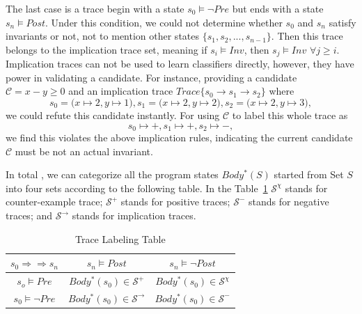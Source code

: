 The last case is a trace begin with a state $s_0 \models \neg Pre$ but ends with a state $s_n \models Post$.
Under this condition, we could not determine whether $s_0$ and $s_n$ satisfy invariants or not,
not to mention other states $\{s_1, s_2, ..., s_{n-1}\}$.
Then this trace belongs to the implication trace set, meaning if $s_i \models Inv$, then $s_j \models Inv$ $\forall j \ge i$.
Implication traces can not be used to learn classifiers directly, 
however, they have power in validating a candidate.
For instance, providing a candidate $\mathcal{C} = x - y \ge 0$ and an implication trace 
$Trace\{s_0 \to s_1 \to s_2\}$ where 
$$s_0 = \big(x \mapsto 2, y \mapsto 1\big),  s_1 = \big(x \mapsto 2, y \mapsto 2\big),  s_2 = \big(x \mapsto 2, y \mapsto 3\big),$$
we could refute this candidate instantly.
For using $\mathcal{C}$ to label this whole trace as $$s_0 \mapsto +,  s_1 \mapsto +,  s_2 \mapsto -,$$ 
we find this violates the above implication rules,
indicating the current candidate $\mathcal{C}$ must be not an actual invariant.


In total , we can categorize all the program states $Body^*(S)$ started from Set $S$ into four sets according to the following table.
In the Table~\ref{tab:labeling}
$\mathcal{S}^\chi$ stands for counter-example trace;
$\mathcal{S}^+$ stands for positive traces;
$\mathcal{S}^-$ stands for negative traces; 
and $\mathcal{S}^\rightarrow$ stands for implication traces.

\begin{table}[htb]
\label{tab:labeling}
\centering
\begin{tabular}[float]{|c|c|c|}
\hline
$s_0 \Rightarrow \Rightarrow s_n$ & $s_n \models Post$            & $s_n \models \neg Post$\\
\hline
$s_o \models Pre$                 & $Body^*(s_0) \in \mathcal{S}^+$       & $Body^*(s_0) \in \mathcal{S}^\chi$\\
\hline
$s_0 \models \neg Pre$            & $Body^*(s_0) \in \mathcal{S}^\rightarrow$       & $Body^*(s_0) \in \mathcal{S}^-$\\
\hline
\end{tabular}
\caption{Trace Labeling Table}
\end{table}

